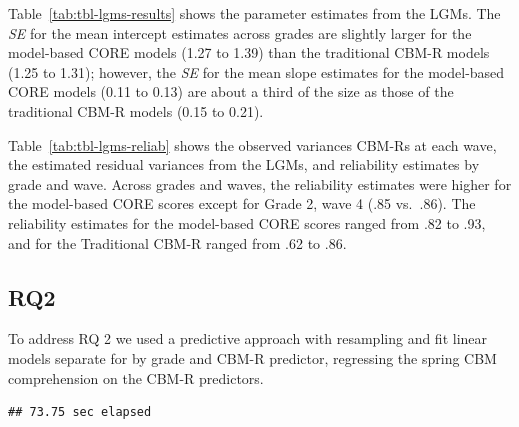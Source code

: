 \documentclass[
  english,
  man, fleqn, noextraspace]{apa6}
\begin{document}
Table~\ref{tab:tbl-lgms-results} shows the parameter estimates from the LGMs. The \emph{SE} for the mean intercept estimates across grades are slightly larger for the model-based CORE models (1.27 to 1.39) than the traditional CBM-R models (1.25 to 1.31); however, the \emph{SE} for the mean slope estimates for the model-based CORE models (0.11 to 0.13) are about a third of the size as those of the traditional CBM-R models (0.15 to 0.21).

Table~\ref{tab:tbl-lgms-reliab} shows the observed variances CBM-Rs at each wave, the estimated residual variances from the LGMs, and reliability estimates by grade and wave. Across grades and waves, the reliability estimates were higher for the model-based CORE scores except for Grade 2, wave 4 (.85 vs.~.86). The reliability estimates for the model-based CORE scores ranged from .82 to .93, and for the Traditional CBM-R ranged from .62 to .86.

\hypertarget{rq2}{%
\subsection{RQ2}\label{rq2}}

To address RQ 2 we used a predictive approach with resampling and fit linear models separate for by grade and CBM-R predictor, regressing the spring CBM comprehension on the CBM-R predictors.

\begin{verbatim}
## 73.75 sec elapsed
\end{verbatim}
\end{document}
